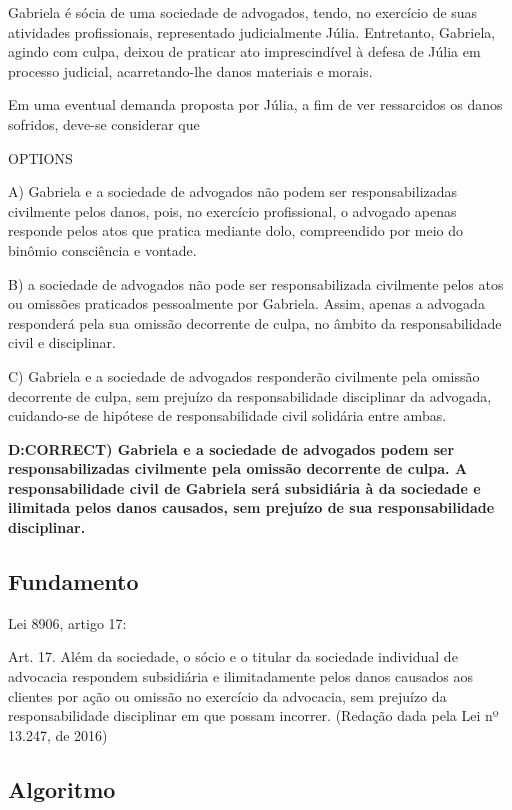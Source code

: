 \documentclass[12pt]{article}
\begin{document}
Gabriela é sócia de uma sociedade de advogados, tendo, no 
exercício de suas atividades profissionais, representado 
judicialmente Júlia. Entretanto, Gabriela, agindo com culpa, 
deixou de praticar ato imprescindível à defesa de Júlia em 
processo judicial, acarretando-lhe danos materiais e morais.  
 
Em uma eventual demanda proposta por Júlia, a fim de ver 
ressarcidos os danos sofridos, deve-se considerar que 

OPTIONS

A) Gabriela e a sociedade de advogados não podem ser 
responsabilizadas civilmente pelos danos, pois, no 
exercício profissional, o advogado apenas responde pelos 
atos que pratica mediante dolo, compreendido por meio 
do binômio consciência e vontade. 

B) a sociedade de advogados não pode ser responsabilizada 
civilmente pelos atos ou omissões praticados 
pessoalmente por Gabriela. Assim, apenas a advogada 
responderá pela sua omissão decorrente de culpa, no 
âmbito da responsabilidade civil e disciplinar. 

C) Gabriela e a sociedade de advogados responderão 
civilmente pela omissão decorrente de culpa, sem prejuízo 
da responsabilidade disciplinar da advogada, cuidando-se 
de hipótese de responsabilidade civil solidária entre 
ambas. 

\textbf{D:CORRECT) Gabriela e a sociedade de advogados podem ser responsabilizadas civilmente pela omissão decorrente de 
culpa. A responsabilidade civil de Gabriela será subsidiária 
à da sociedade e ilimitada pelos danos causados, sem 
prejuízo de sua responsabilidade disciplinar. }

\subsection{Fundamento}

Lei 8906, artigo 17:

Art. 17.  Além da sociedade, o sócio e o titular da sociedade individual de advocacia respondem subsidiária e ilimitadamente pelos danos causados aos clientes por ação ou omissão no exercício da advocacia, sem prejuízo da responsabilidade disciplinar em que possam incorrer.               (Redação dada pela Lei nº 13.247, de 2016)

\subsection{Algoritmo}
\end{document}
